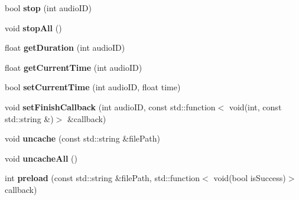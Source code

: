 \begin{DoxyCompactItemize}
\mbox{\label{classexperimental_1_1AudioEngineImpl_a811786e91bb552443b011659e35483bb}} 
bool {\bfseries stop} (int audio\+ID)
\item 
\mbox{\label{classexperimental_1_1AudioEngineImpl_abcf87e42d6015ae5a0760ce815fb6f28}} 
void {\bfseries stop\+All} ()
\item 
\mbox{\label{classexperimental_1_1AudioEngineImpl_a12fa2f700f4d6e4effc72e1ad7e030cb}} 
float {\bfseries get\+Duration} (int audio\+ID)
\item 
\mbox{\label{classexperimental_1_1AudioEngineImpl_a47be5365efeebd307e3891f3f71386f0}} 
float {\bfseries get\+Current\+Time} (int audio\+ID)
\item 
\mbox{\label{classexperimental_1_1AudioEngineImpl_a8abd3b8330fb7ca7f513016055333f9c}} 
bool {\bfseries set\+Current\+Time} (int audio\+ID, float time)
\item 
\mbox{\label{classexperimental_1_1AudioEngineImpl_ab4bc0ee1754fda9638d7d0c4470cf170}} 
void {\bfseries set\+Finish\+Callback} (int audio\+ID, const std\+::function$<$ void(int, const std\+::string \&)$>$ \&callback)
\item 
\mbox{\label{classexperimental_1_1AudioEngineImpl_a4ad8d3d499bf3e5fd262d710b215891e}} 
void {\bfseries uncache} (const std\+::string \&file\+Path)
\item 
\mbox{\label{classexperimental_1_1AudioEngineImpl_ae439dacc5acebf311686ebf6f1f6b3df}} 
void {\bfseries uncache\+All} ()
\item 
\mbox{\label{classexperimental_1_1AudioEngineImpl_acef595ca5ae1dbb5731a9d040059fde2}} 
int {\bfseries preload} (const std\+::string \&file\+Path, std\+::function$<$ void(bool is\+Success)$>$ callback)
\item 
\mbox{\label{classexperimental_1_1AudioEngineImpl_a0aa9187ac5e5341a505cf6154feceaee}} 

\end{DoxyCompactItemize}
